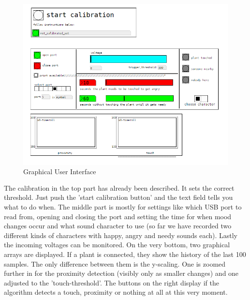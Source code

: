 \begin{figure}[H]
\begin{center}
\includegraphics[width=0.9\linewidth]{Figures/GUI.png}
\caption{Graphical User Interface}
\end{center}
\end{figure}


The calibration in the top part has already been described. It sets the correct threshold. Just push the 'start calibration button' and the text field tells you what to do when.
The middle part is mostly for settings like which USB port to read from, opening and closing the port and setting the time for when mood changes occur and what sound character to use (so far we have recorded two different kinds of characters with happy, angry and needy sounds each). Lastly the incoming voltages can be monitored. On the very bottom, two graphical arrays are displayed. If a plant is connected, they show the history of the last 100 samples. The only difference between them is the y-scaling. One is zoomed further in for the proximity detection (visibly only as smaller changes) and one adjusted to the 'touch-threshold'. The buttons on the right display if the algorithm detects a touch, proximity or nothing at all at this very moment. 





